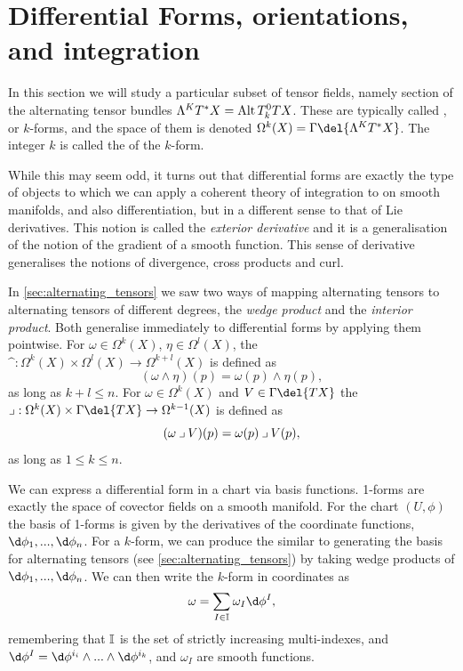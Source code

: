 \section{Differential Forms, orientations, and integration}
\label{sec:integration}
In this section we will study a particular subset of tensor fields, namely section of the alternating tensor bundles \(\Lambda^K T^* X = \operatorname{Alt} T^0_k TX\).
These are typically called , or \(k\)-forms, and the space of them is denoted \(\Omega^k(X) = \Gamma\del{\Lambda^K T^* X}\).
The integer \(k\) is called the  of the \(k\)-form.

While this may seem odd, it turns out that differential forms are exactly the type of objects to which we can apply a coherent theory of integration to on smooth manifolds, and also differentiation, but in a different sense to that of Lie derivatives.
This notion is called the \emph{exterior derivative} and it is a generalisation of the notion of the gradient of a smooth function.
This sense of derivative generalises the notions of divergence, cross products and curl.

In \cref{sec:alternating_tensors} we saw two ways of mapping alternating tensors to alternating tensors of different degrees, the \emph{wedge product} and the \emph{interior product}.
Both generalise immediately to differential forms by applying them pointwise.
For \(\omega \in \Omega^k(X)\), \(\eta\in \Omega^l(X)\), the  \(\^:\Omega^k(X) \times \Omega^l(X) \to \Omega^{k+l}(X)\) is defined as
\[(\omega \wedge \eta)(p) = \omega(p) \wedge \eta(p),\]
 as long as \(k+l \leq n\). 
For \(\omega \in \Omega^k(X)\) and \(V\in \Gamma\del{TX}\) the  \(\iprod: \Omega^k(X) \times \Gamma\del{TX} \to \Omega^{k-1}(X)\) is defined as
\[(\omega \mathbin{\lrcorner} V)(p) = \omega(p) \mathbin{\lrcorner} V(p),\] as long as \(1\leq k\leq n\).

We can express a differential form in a chart via basis functions.
1-forms are exactly the space of covector fields on a smooth manifold.
For the chart \((U, \phi)\) the basis of 1-forms is given by the derivatives of the coordinate functions, \(\d\phi_1, ...,\d\phi_n\).
For a \(k\)-form, we can produce the  similar to generating the basis for alternating tensors (see \cref{sec:alternating_tensors}) by taking wedge products of \(\d\phi_1, ...,\d\phi_n\).
We can then write the \(k\)-form in coordinates as 
\[\omega = \sum_{I\in \bb{I}} \omega_I \d\phi^I,\]
remembering that \(\bb{I}\) is the set of strictly increasing multi-indexes, and \(\d\phi^I = \d\phi^{i_i}\wedge ... \wedge\d\phi^{i_k}\), and \(\omega_I\) are smooth functions.

